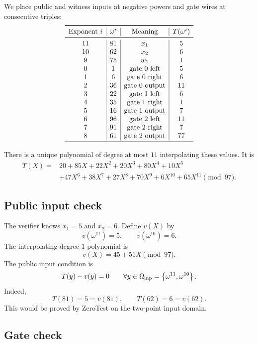 We place public and witness inputs at negative powers and gate wires at consecutive triples:
\[
\begin{array}{c|c|c|c}
\toprule
\text{Exponent }i & \omega^i & \text{Meaning} & T(\omega^i)\\
\midrule
11 & 81 & x_1 & 5\\
10 & 62 & x_2 & 6\\
9 & 75 & w_1 & 1\\
0 & 1 & \text{gate 0 left} & 5\\
1 & 6 & \text{gate 0 right} & 6\\
2 & 36 & \text{gate 0 output} & 11\\
3 & 22 & \text{gate 1 left} & 6\\
4 & 35 & \text{gate 1 right} & 1\\
5 & 16 & \text{gate 1 output} & 7\\
6 & 96 & \text{gate 2 left} & 11\\
7 & 91 & \text{gate 2 right} & 7\\
8 & 61 & \text{gate 2 output} & 77\\
\bottomrule
\end{array}
\]

There is a unique polynomial of degree at most $11$ interpolating these values. It is
\[
\begin{aligned}
T(X)={}&20+85X+22X^2+20X^3+80X^4+10X^5\\
&+47X^6+38X^7+27X^8+70X^9+6X^{10}+65X^{11}
\pmod{97}.
\end{aligned}
\]

\subsection{Public input check}

The verifier knows $x_1=5$ and $x_2=6$. Define $v(X)$ by
\[
    v(\omega^{11})=5,
    \qquad
    v(\omega^{10})=6.
\]
The interpolating degree-$1$ polynomial is
\[
    v(X)=45+51X\pmod{97}.
\]
The public input condition is
\[
    T(y)-v(y)=0
    \qquad
    \forall y\in\Omega_{\mathrm{inp}}=\left\{\omega^{11},\omega^{10}\right\}.
\]
Indeed,
\[
    T(81)=5=v(81),
    \qquad
    T(62)=6=v(62).
\]
This would be proved by ZeroTest on the two-point input domain.

\subsection{Gate check}


